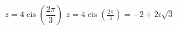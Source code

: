 { $z = 4\operatorname{cis}\left(\dfrac{2\pi}{3}\right)$ }
{ $z = 4\operatorname{cis}\left(\frac{2\pi}{3}\right) = -2+2i\sqrt{3}$}
